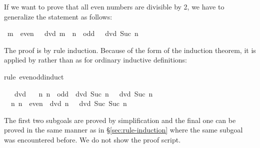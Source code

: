 \begin{isabellebody}
\begin{isamarkuptext}
If we want to prove that all even numbers are divisible by 2, we have to generalize
the statement as follows:%
\end{isamarkuptext}%
\ {\isachardoublequote}{\isacharparenleft}m\ {\isasymin}\ even\ {\isasymlongrightarrow}\ {}\ dvd\ m{\isacharparenright}\ {\isasymand}\ {\isacharparenleft}n\ {\isasymin}\ odd\ {\isasymlongrightarrow}\ {}\ dvd\ {\isacharparenleft}Suc\ n{\isacharparenright}{\isacharparenright}{\isachardoublequote}%
\begin{isamarkuptxt}%
\noindent
The proof is by rule induction. Because of the form of the induction theorem, it is
applied by  rather than  as for ordinary inductive definitions:%
\end{isamarkuptxt}%
rule\ even{\isacharunderscore}odd{\isachardot}induct{\isacharparenright}%
\begin{isamarkuptxt}%
\begin{isabelle}%
\ {}{\isachardot}\ {}\ dvd\ {}\isanewline
\ {}{\isachardot}\ {\isasymAnd}n{\isachardot}\ {\isasymlbrakk}n\ {\isasymin}\ odd{\isacharsemicolon}\ {}\ dvd\ Suc\ n{\isasymrbrakk}\ {\isasymLongrightarrow}\ {}\ dvd\ Suc\ n\isanewline
\ {}{\isachardot}\ {\isasymAnd}n{\isachardot}\ {\isasymlbrakk}n\ {\isasymin}\ even{\isacharsemicolon}\ {}\ dvd\ n{\isasymrbrakk}\ {\isasymLongrightarrow}\ {}\ dvd\ Suc\ {\isacharparenleft}Suc\ n{\isacharparenright}%
\end{isabelle}
The first two subgoals are proved by simplification and the final one can be
proved in the same manner as in \S\ref{sec:rule-induction}
where the same subgoal was encountered before.
We do not show the proof script.%
\end{isamarkuptxt}%
\end{isabellebody}%
